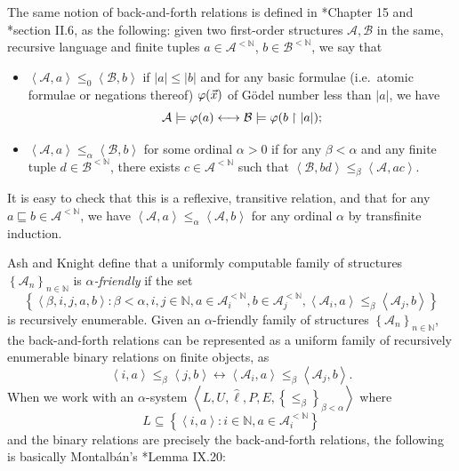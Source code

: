 \documentclass[11pt]{article}
\theoremstyle{plain}
\theoremstyle{definition}
\newcommand{\tuple}[1]{\left\langle #1 \right\rangle}
\begin{document}
The same notion of back-and-forth relations is defined in \cite{ash-knight00-computable-structures}*{Chapter 15} and \cite{montalban26-computable-structure}*{section II.6}, as the following: given two first-order structures $\mathcal{A}, \mathcal{B}$ in the same, recursive language and finite tuples $a \in \mathcal{A}^{<\mathbb{N}}$, $b \in \mathcal{B}^{<\mathbb{N}}$, we say that
\begin{itemize}
  \item $\tuple{\mathcal{A}, a} \leq_0 \tuple{\mathcal{B}, b}$ if $\left|a\right| \leq \left|b\right|$ and for any basic formulae (i.e.\ atomic formulae or negations thereof) $\varphi\mleft(\vec{x}\mright)$ of G\"odel number less than $\left|a\right|$, we have \[\mathcal{A} \models \varphi\mleft(a\mright) \longleftrightarrow \mathcal{B} \models \varphi\mleft(b \upharpoonright \left|a\right|\mright);\]
  \item $\tuple{\mathcal{A}, a} \leq_\alpha \tuple{\mathcal{B}, b}$ for some ordinal $\alpha > 0$ if for any $\beta < \alpha$ and any finite tuple $d \in \mathcal{B}^{<\mathbb{N}}$, there exists $c \in \mathcal{A}^{<\mathbb{N}}$ such that $\tuple{\mathcal{B}, bd} \leq_\beta \tuple{\mathcal{A}, ac}$.
\end{itemize}
It is easy to check that this is a reflexive, transitive relation, and that for any $a \sqsubseteq b \in \mathcal{A}^{<\mathbb{N}}$, we have $\tuple{\mathcal{A}, a} \leq_\alpha \tuple{\mathcal{A}, b}$ for any ordinal $\alpha$ by transfinite induction.

Ash and Knight \cite{ash-knight00-computable-structures} define that a uniformly computable family of structures $\left\{\mathcal{A}_n\right\}_{n \in \mathbb{N}}$ is \emph{$\alpha$-friendly} if the set
\[\left\{\tuple{\beta, i, j, a, b} : \beta < \alpha, i, j \in \mathbb{N}, a \in \mathcal{A}_i^{<\mathbb{N}}, b \in \mathcal{A}_j^{<\mathbb{N}}, \tuple{\mathcal{A}_i, a} \leq_\beta \tuple{\mathcal{A}_j, b}\right\}\]
is recursively enumerable. Given an $\alpha$-friendly family of structures $\left\{\mathcal{A}_n\right\}_{n \in \mathbb{N}}$, the back-and-forth relations can be represented as a uniform family of recursively enumerable binary relations on finite objects, as
\[\tuple{i, a} \leq_\beta \tuple{j, b} \longleftrightarrow \tuple{\mathcal{A}_i, a} \leq_\beta \tuple{\mathcal{A}_j, b}.\]
When we work with an $\alpha$-system $\tuple{L, U, \hat{\ell}, P, E, \left\{\leq_\beta\right\}_{\beta < \alpha}}$ where
\[L \subseteq \left\{\tuple{i, a} : i \in \mathbb{N}, a \in \mathcal{A}_i^{<\mathbb{N}}\right\}\]
and the binary relations are precisely the back-and-forth relations, the following is basically Montalb\'an's \cite{montalban26-computable-structure}*{Lemma IX.20}:
\end{document}
